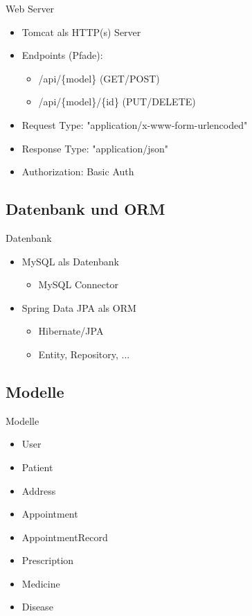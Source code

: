 \documentclass{beamer}
\begin{document}
\begin{frame}{Web Server}

\begin{itemize}
\item Tomcat als HTTP(s) Server
\item Endpoints (Pfade):
   \begin{itemize}
     \item /api/\{model\} \hspace{10mm} (GET/POST)
     \item /api/\{model\}/\{id\} \hspace{2mm} (PUT/DELETE)
   \end{itemize}
\item Request Type: "application/x-www-form-urlencoded"
\item Response Type: "application/json"
\item Authorization: Basic Auth
\end{itemize}

\end{frame}


\subsection{Datenbank und ORM}

\begin{frame}{Datenbank}

\begin{itemize}
\item MySQL als Datenbank
   \begin{itemize}
     \item MySQL Connector
   \end{itemize}
\item Spring Data JPA als ORM
   \begin{itemize}
     \item Hibernate/JPA
     \item Entity, Repository, ...
   \end{itemize}
\end{itemize}

\end{frame}

\subsection{Modelle}


\begin{frame}{Modelle}

\begin{itemize}
\item User
\item Patient
\item Address
\item Appointment
\item AppointmentRecord
\item Prescription
\item Medicine
\item Disease
\end{itemize}

\end{frame}
\end{document}
